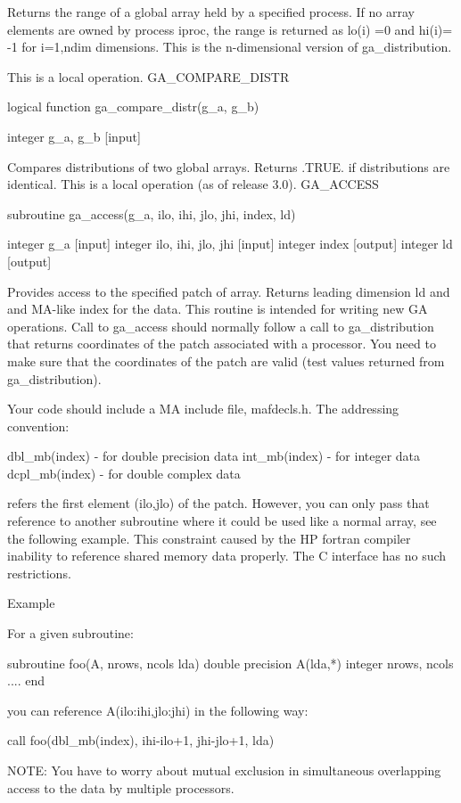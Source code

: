 Returns the range of a global array held by a specified process. If
no array elements are owned by process iproc, the range is returned
as lo(i) =0 and hi(i)= -1 for i=1,ndim dimensions. This is the n-dimensional
version of ga\_distribution.

This is a local operation. GA\_COMPARE\_DISTR

logical function ga\_compare\_distr(g\_a, g\_b)

integer g\_a, g\_b {[}input{]}

Compares distributions of two global arrays. Returns .TRUE. if distributions
are identical. This is a local operation (as of release 3.0). GA\_ACCESS

subroutine ga\_access(g\_a, ilo, ihi, jlo, jhi, index, ld)

integer g\_a {[}input{]} integer ilo, ihi, jlo, jhi {[}input{]} integer
index {[}output{]} integer ld {[}output{]}

Provides access to the specified patch of array. Returns leading dimension
ld and and MA-like index for the data. This routine is intended for
writing new GA operations. Call to ga\_access should normally follow
a call to ga\_distribution that returns coordinates of the patch associated
with a processor. You need to make sure that the coordinates of the
patch are valid (test values returned from ga\_distribution).

Your code should include a MA include file, mafdecls.h. The addressing
convention:

dbl\_mb(index) - for double precision data int\_mb(index) - for integer
data dcpl\_mb(index) - for double complex data

refers the first element (ilo,jlo) of the patch. However, you can
only pass that reference to another subroutine where it could be used
like a normal array, see the following example. This constraint caused
by the HP fortran compiler inability to reference shared memory data
properly. The C interface has no such restrictions.

Example

For a given subroutine:

subroutine foo(A, nrows, ncols lda) double precision A(lda,{*}) integer
nrows, ncols .... end

you can reference A(ilo:ihi,jlo:jhi) in the following way:

call foo(dbl\_mb(index), ihi-ilo+1, jhi-jlo+1, lda)

NOTE: You have to worry about mutual exclusion in simultaneous overlapping
access to the data by multiple processors.

